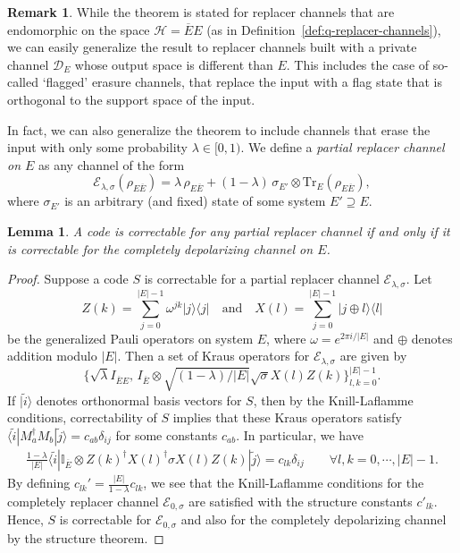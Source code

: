 \documentclass[11pt]{amsart}
\newtheorem{lem}[thm]{Lemma}
\theoremstyle{definition}
\theoremstyle{definition}
\theoremstyle{definition}
\newtheorem{remark}[thm]{Remark}
\newcommand{\mbb}{\mathbb}
\newcommand{\mc}{\mathcal}
\newcommand{\tr}{\textrm{Tr}}
\newcommand{\op}[2]{|#1\rangle\langle #2|}
\newcommand{\1}{\mathbb{I}}
\newcommand{\wt}{\widetilde}
\def\ket#1{| #1 \rangle}
\def\bra#1{\langle #1 |}
\begin{document}
\begin{remark}\label{partialreplacernote} 
While the theorem is stated for replacer channels that are endomorphic on the space $\mc{H} = \overline{E}E$ (as in Definition~\ref{def:q-replacer-channels}), we can easily generalize the result to replacer channels built with a private channel $\mc{D}_E$ whose output space is different than $E$.  This includes the case of so-called `flagged' erasure channels, that replace the input with a flag state that is orthogonal to the support space of the input.  

In fact, we can also generalize the theorem to include channels that erase the input with only some probability $\lambda\in[0,1)$.  We define a \textit{partial replacer channel on $E$} as any channel of the form
\begin{equation}
    \mc{E}_{\lambda,\sigma}(\rho_{E\overline{E}})=\lambda \, \rho_{E\overline{E}}+(1-\lambda)\, \sigma_{E'}\otimes\tr_E (\rho_{E\overline{E}}),
\end{equation}
where $\sigma_{E'}$ is an arbitrary (and fixed) state of some system $E'\supseteq E$. 
    \begin{lem}
    A code is correctable for any partial replacer channel if and only if it is correctable for the completely depolarizing channel on $E$.
\end{lem}

\begin{proof}
    Suppose a code $S$ is correctable for a partial replacer channel $\mc{E}_{\lambda,\sigma}$.
    Let 
    \[
    Z(k)=\sum_{j=0}^{|E|-1}\omega^{jk}\op{j}{j} \quad \mathrm{and} \quad  X(l)=\sum_{j=0}^{|E|-1}\op{j\oplus l}{l}
    \]
    be the generalized Pauli operators on system $E$, where $\omega=e^{2\pi i/|E|}$ and $\oplus$ denotes addition modulo $|E|$.  Then a set of Kraus operators for $\mc{E}_{\lambda,\sigma}$ are given by 
    \[
    \big\{\sqrt{\lambda} I_{\overline{E}E}, \, I_{\overline{E}}\otimes\sqrt{(1-\lambda)/|E|}\sqrt{\sigma}X(l)Z(k)\big\}_{l,k=0}^{|E|-1}.  
    \]
    If $\ket{\widetilde{i}}$ denotes orthonormal basis vectors for $S$, then by the Knill-Laflamme conditions, correctability of $S$ implies that these Kraus operators satisfy $\bra{\wt{i}}M^\dagger_aM_b\ket{\wt{j}}= c_{ab}\delta_{ij}$
    for some constants $c_{ab}$.  In particular, we have
    \begin{align}
        \frac{1-\lambda}{|E|}\bra{\wt{i}}\mbb{I}_{\overline{E}}\otimes Z(k)^\dagger X(l)^\dagger \sigma X(l)Z(k)\ket{\wt{j}}=c_{lk}\delta_{ij} \qquad \forall l,k=0,\cdots,|E|-1.
    \end{align}
By defining $c_{lk}'=\frac{|E|}{1-\lambda}c_{lk}$, we see that the Knill-Laflamme conditions for the completely replacer channel $\mc{E}_{0,\sigma}$ are satisfied with the structure constants $c'_{lk}$.  Hence, $S$ is correctable for $\mc{E}_{0,\sigma}$ and also for the completely depolarizing channel by the structure theorem.


\end{proof}
\end{remark}
\end{document}
